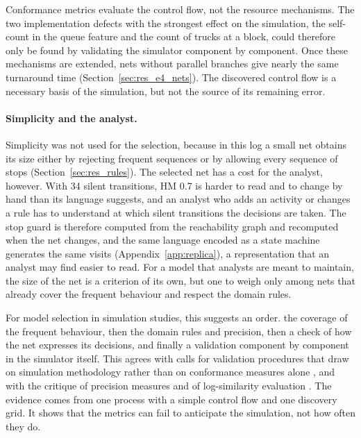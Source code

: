 Conformance metrics evaluate the control flow, not the resource mechanisms. The two
implementation defects with the strongest effect on the simulation, the self-count in
the queue feature and the count of trucks at a block, could therefore only be found by validating the simulator
component by component. Once these mechanisms are extended, nets without parallel
branches give nearly the same turnaround time (Section~\ref{sec:res_e4_nets}). The
discovered control flow is a necessary basis of the simulation, but not the source of
its remaining error.

\paragraph{Simplicity and the analyst.} Simplicity was not used for the selection,
because in this log a small net obtains its size either by rejecting frequent
sequences or by allowing every sequence of stops (Section~\ref{sec:res_rules}). The
selected net has a cost for the analyst, however. With 34 silent transitions, HM 0.7
is harder to read and to change by hand than its language suggests, and an analyst
who adds an activity or changes a rule has to understand at which silent transitions
the decisions are taken. The stop guard is therefore computed from the reachability
graph and recomputed when the net changes, and the same language encoded as a state
machine generates the same visits (Appendix~\ref{app:replica}), a representation that
an analyst may find easier to read. For a model that analysts are meant to maintain,
the size of the net is a criterion of its own, but one to weigh only among nets that
already cover the frequent behaviour and respect the domain rules.

For model selection in simulation studies, this suggests an order.  the coverage
of the frequent behaviour, then the domain rules and precision, then a check of how
the net expresses its decisions, and finally a validation component by component in
the simulator itself. This agrees with calls for validation procedures that draw on
simulation methodology rather than on conformance measures alone
\cite{Sulis2026SimulationReview}, and with the critique of precision measures
\cite{Tax2018Imprecisions} and of log-similarity evaluation
\cite{Oezdemir2025RethinkingBPS}. The evidence comes from one process with a simple
control flow and one discovery grid. It shows that the metrics can fail to anticipate
the simulation, not how often they do.


